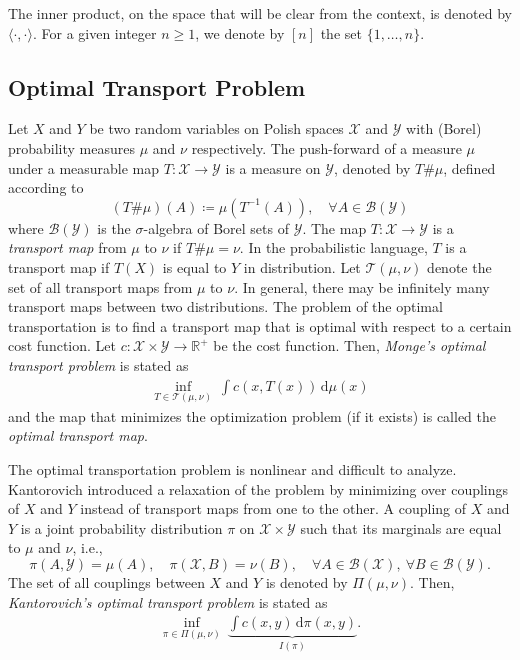 \documentclass[10pt]{article}
\newcommand{\ud}{\,\mathrm{d}}
\newcommand{\real}{\mathbb{R}}
\newcommand{\calX}{\mathcal{X}}
\newcommand{\calY}{\mathcal{Y}}
\numberwithin{equation}{section}
\begin{document}
The inner product, on the space that will be clear from the context, is denoted by $\langle \cdot, \cdot\rangle$. 
For a given integer $n \geq 1$, we denote by $[n]$ the set $\{1,\ldots, n\}$. 


\subsection{Optimal Transport Problem}
Let $X$ and $Y$ be two random variables on Polish spaces $\mathcal{X}$ and $\mathcal{Y}$ with (Borel) probability measures $\mu$ and $\nu$ respectively. 
The push-forward of a measure $\mu$ under a measurable map $T:\calX \to \calY$ is a measure on $\calY$, denoted by $T\#\mu$, defined according to
\begin{equation*}
(T\#\mu) (A) \coloneqq \mu(T^{-1}(A)),\quad \forall A \in \mathcal{B}(\calY)
\end{equation*}
where $\mathcal{B}(\calY)$ is the $\sigma$-algebra of Borel sets of $\calY$.
The map $T:\calX \to \calY$ is a {\it transport map} from $\mu$ to $\nu$ if $T\#\mu = \nu$. 
In the probabilistic language, $T$ is a transport map if $T(X)$ is equal to $Y$ in distribution. 
Let $\mathcal{T}(\mu,\nu)$ denote the set of all transport maps from $\mu$ to $\nu$. 
In general, there may be infinitely many transport maps between two distributions. The problem of the optimal transportation is to find a transport map that is optimal with respect to a certain cost function. Let $c:\calX \times \calY \to \real^+$ be the cost function. Then, {\em Monge's optimal transport problem} is stated as
\begin{align}
\inf_{T \in \mathcal{T}(\mu,\nu)}~ \int c(x,T(x)) \ud \mu(x)
\label{eq:Monge-form}
\end{align}
and the map that minimizes the optimization problem (if it exists) is called the {\it optimal transport map}. 

The optimal transportation problem is nonlinear and difficult to analyze. Kantorovich introduced a relaxation of the problem by minimizing over couplings of $X$ and $Y$ instead of transport maps from one to the other. A coupling of $X$ and $Y$ is a joint probability distribution $\pi$ on $\calX \times \calY$ such that its marginals are equal to $\mu$ and $\nu$, i.e., 
\begin{equation*}
\pi(A,\calY) = \mu(A),\quad \pi(\calX,B) = \nu(B),\quad \forall A\in\mathcal{B}(\calX),~\forall B \in \mathcal{B}(\calY).
\end{equation*}
The set of all couplings between $X$ and $Y$ is denoted by $\Pi(\mu,\nu)$. 
Then, 
{\em Kantorovich's optimal transport problem} is stated as
\begin{align}
\inf_{\pi \in \Pi(\mu,\nu)}~
\underbrace{\int c(x,y)\ud \pi(x,y)}_{I(\pi)}.
\label{eq:Kantorovich-form}
\end{align}
\end{document}
